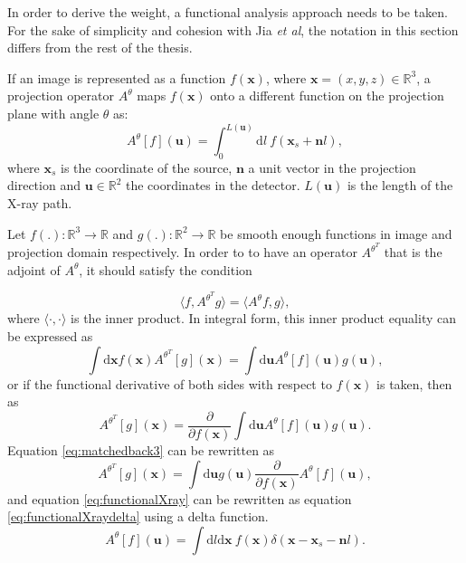 In order to derive the weight, a functional analysis approach needs to be taken. For the sake of simplicity and cohesion with Jia \textit{et al}, the notation in this section differs from the rest of the thesis. 

If an image is represented as a function $f(\textbf{x})$, where $\textbf{x}=(x,y,z)\in \mathbb{R}^3$, a projection operator $A^\theta$ maps $f(\textbf{x})$ onto a different function on the projection plane with angle $\theta$ as:
\begin{equation}
A^\theta[f](\textbf{u})=\int_0^{L(\textbf{u})}\mathrm{d}l \ f(\textbf{x}_s+\textbf{n}l),
\label{eq:functionalXray}
\end{equation}
where $\textbf{x}_s$ is the coordinate of the source, $\textbf{n}$ a unit vector in the projection direction and $\textbf{u}\in \mathbb{R}^2 $ the coordinates in the detector. $L(\textbf{u})$ is the length of the X-ray path. 

Let $f(.):\mathbb{R}^3 \rightarrow \mathbb{R}$ and $g(.):\mathbb{R}^2 \rightarrow \mathbb{R}$ be smooth enough functions in image and  projection domain respectively. In order to to have an operator $A^{\theta^T}$ that is the adjoint of $A^\theta$, it should satisfy the condition 

\begin{equation}
\langle f, A^{\theta^T} g\rangle = \langle A^\theta f,g \rangle,
\end{equation}
where $\langle \cdot, \cdot\rangle $ is the inner product. In integral form, this inner product equality can be expressed as
\begin{equation}
\int \mathrm{d}\textbf{x}f(\textbf{x})A^{\theta^T} [g](\textbf{x})=\int \mathrm{d}\textbf{u}A^{\theta} [f](\textbf{u}) g(\textbf{u}),
\end{equation}
or if the functional derivative of both sides with respect to $f(\textbf{x})$ is taken, then as
\begin{equation}
A^{\theta^T} [g](\textbf{x})=\frac{\partial}{\partial f(\textbf{x})}\int \mathrm{d}\textbf{u}A^{\theta} [f](\textbf{u}) g(\textbf{u}).
\label{eq:matchedback3}
\end{equation}
Equation \ref{eq:matchedback3} can be rewritten as
\begin{equation}
A^{\theta^T} [g](\textbf{x})=\int \mathrm{d}\textbf{u}g(\textbf{u})\frac{\partial}{\partial f(\textbf{x})}A^{\theta} [f](\textbf{u}),
\label{eq:matchedback4}
\end{equation}
and equation \ref{eq:functionalXray} can be rewritten as equation \ref{eq:functionalXraydelta} using a delta function.
\begin{equation}
A^\theta[f](\textbf{u})=\int\mathrm{d}l\mathrm{d}\textbf{x} \ f(\textbf{x})\delta(\textbf{x}-\textbf{x}_s-\textbf{n}l).
\label{eq:functionalXraydelta}
\end{equation}

